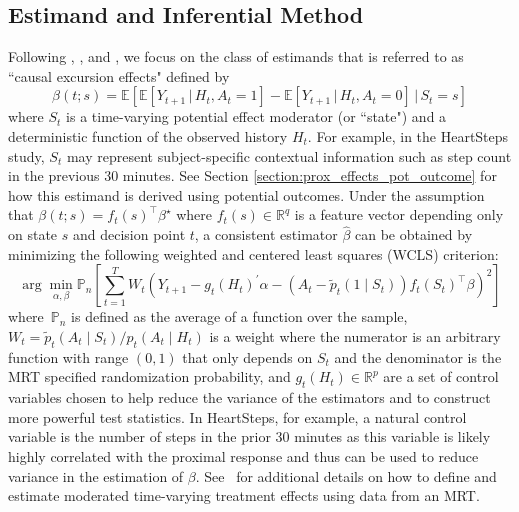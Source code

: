 \documentclass[12pt]{article}
\def\E{\mathbb{E}}
\def\given{\, | \,}
\begin{document}
\subsection{Estimand and Inferential Method}
\label{section:standardmrtmethods}

Following \cite{Boruvkaetal}, \cite{Qian2021}, and \cite{DempseyAOAS}, we focus on the class of estimands that is referred to as ``causal excursion effects" defined by
$$
\beta (t;s) = \E \left[ \E \left[ Y_{t+1} \given H_t, A_t = 1 \right] - \E \left[ Y_{t+1} \given H_t, A_t = 0 \right] \given S_t = s\right]
$$
where $S_t$ is a time-varying potential effect moderator (or ``state") and a deterministic function of the observed history $H_t$. For example, in the HeartSteps study, $S_t$ may represent subject-specific contextual information such as step count in the previous 30 minutes.
See Section \ref{section:prox_effects_pot_outcome} for how this estimand is derived using potential outcomes.  Under the assumption that $\beta(t;s) = f_t(s)^\top \beta^\star$ where $f_t(s) \in \mathbb{R}^q$ is a feature vector depending only on state $s$ and decision point $t$, a consistent estimator $\hat \beta$ can be obtained by minimizing the following weighted and centered least squares (WCLS) criterion:
\begin{equation}
\label{eq:mrtstandard}
\arg \min_{\alpha, \beta} \mathbb{P}_n \left[ \sum_{t=1}^T W_t \left( Y_{t+1} - g_t(H_t)^\prime \alpha - (A_t - \tilde p_t (1 \mid S_t)) f_t (S_t)^\top \beta \right)^2 \right]
\end{equation}
where~$\mathbb{P}_n$ is defined as the average of a function over the sample, $W_t = \tilde p_t (A_t \mid S_t) / p_t (A_t \mid H_t)$ is a weight where the numerator is an arbitrary function with range $(0,1)$ that only depends on $S_t$ and the denominator is the MRT specified randomization probability, and $g_t(H_t) \in \mathbb{R}^p$ are a set of control variables chosen to help reduce the variance of the estimators and to construct more powerful test statistics. In HeartSteps, for example, a natural control variable is the number of steps in the prior 30 minutes as this variable is likely highly correlated with the proximal response and thus can be used to reduce variance in the estimation of $\beta$. See~\cite{Boruvkaetal} for additional details on how to define and estimate moderated time-varying treatment effects using data from an MRT.
\end{document}
